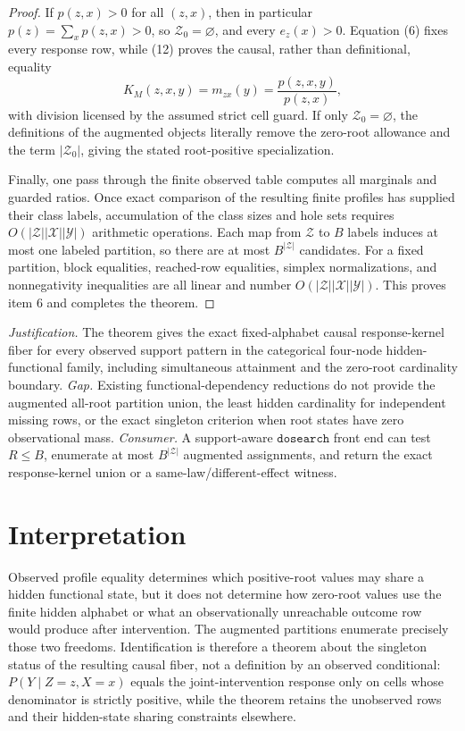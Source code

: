 \documentclass{article}
\begin{document}
\begin{proof}
If \(p(z,x)>0\) for all \((z,x)\), then in particular
\(p(z)=\sum_xp(z,x)>0\), so \(\mathcal Z_0=\varnothing\), and every
\(e_z(x)>0\).  Equation (6) fixes every response row, while (12) proves
the causal, rather than definitional, equality
\[
 K_M(z,x,y)=m_{zx}(y)=\frac{p(z,x,y)}{p(z,x)},
\]
with division licensed by the assumed strict cell guard.  If only
\(\mathcal Z_0=\varnothing\), the definitions of the augmented objects
literally remove the zero-root allowance and the term
\(|\mathcal Z_0|\), giving the stated root-positive specialization.

Finally, one pass through the finite observed table computes all
marginals and guarded ratios.  Once exact comparison of the resulting
finite profiles has supplied their class labels, accumulation of the
class sizes and hole sets requires
\(O(|\mathcal Z||\mathcal X||\mathcal Y|)\) arithmetic operations.
Each map from \(\mathcal Z\) to \(B\) labels induces at most one labeled
partition, so there are at most \(B^{|\mathcal Z|}\) candidates.  For a
fixed partition, block equalities, reached-row equalities, simplex
normalizations, and nonnegativity inequalities are all linear and number
\(O(|\mathcal Z||\mathcal X||\mathcal Y|)\).  This proves item 6 and
completes the theorem.
\end{proof}
\par\smallskip\noindent \textit{Justification.} The theorem gives the exact fixed-alphabet causal response-kernel fiber for every observed support pattern in the categorical four-node hidden-functional family, including simultaneous attainment and the zero-root cardinality boundary. \textit{Gap.} Existing functional-dependency reductions do not provide the augmented all-root partition union, the least hidden cardinality for independent missing rows, or the exact singleton criterion when root states have zero observational mass. \textit{Consumer.} A support-aware \(\texttt{dosearch}\) front end can test \(R\leq B\), enumerate at most \(B^{|\mathcal Z|}\) augmented assignments, and return the exact response-kernel union or a same-law/different-effect witness.

\section{Interpretation}

Observed profile equality determines which positive-root values may share a hidden functional state, but it does not determine how zero-root values use the finite hidden alphabet or what an observationally unreachable outcome row would produce after intervention.  The augmented partitions enumerate precisely those two freedoms.  Identification is therefore a theorem about the singleton status of the resulting causal fiber, not a definition by an observed conditional: \(P(Y\mid Z=z,X=x)\) equals the joint-intervention response only on cells whose denominator is strictly positive, while the theorem retains the unobserved rows and their hidden-state sharing constraints elsewhere.
\end{document}
